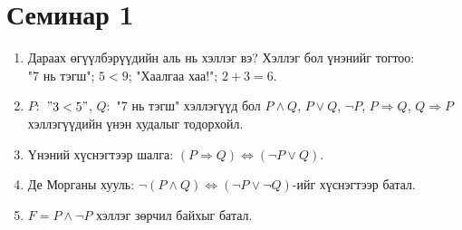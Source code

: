 \section*{Семинар 1}
\begin{enumerate}
  \item Дараах өгүүлбэрүүдийн аль нь хэллэг вэ? Хэллэг бол үнэнийг тогтоо: \\
  "7 нь тэгш"; $5<9$; "Хаалгаа хаа!"; $2+3=6$.
  \item $P:$ $"3<5"$, $Q:$ "7 нь тэгш" хэллэгүүд бол $P\land Q$, $P\lor Q$, $\lnot P$, $P\Rightarrow Q$, $Q\Rightarrow P$ хэллэгүүдийн үнэн худалыг тодорхойл.
  \item Үнэний хүснэгтээр шалга: $(P\Rightarrow Q)\Leftrightarrow(\lnot P\lor Q)$.
  \item Де Морганы хууль: $\lnot(P\land Q)\Leftrightarrow(\lnot P\lor\lnot Q)$-ийг хүснэгтээр батал.
  \item $F= P\land\lnot P$ хэллэг зөрчил байхыг батал.


\end{enumerate}
